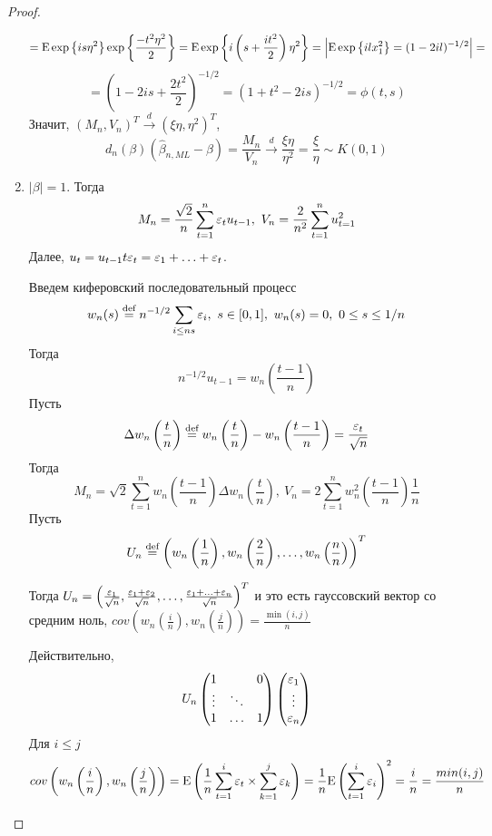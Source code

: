 \begin{proof}
\begin{enumerate}
        \[=\mathrm{E}\exp{\left\{is\eta^2\right\}}\exp{\left\{\frac{-t^2\eta^2}{2}\right\}}=\mathrm{E}\exp{\left\{i\left(s+\frac{it^2}{2}\right)\eta^2\right\}}=\Big\lvert\mathrm{E}\exp{\left\{ilx_1^2\right\}}=(1-2il)^{-1/2}\Big\rvert=\]
        \[=\left(1-2is+\frac{2t^2}{2}\right)^{-1/2}=(1+t^2-2is)^{-1/2}=\phi(t,s)\]
        Значит, $(M_n,V_n)^T\xrightarrow{d}(\xi\eta,\eta^2)^T$,
        \[d_n(\beta)(\widehat{\beta}_{n,ML}-\beta)=\frac{M_n}{V_n}\xrightarrow{d}\frac{\xi\eta}{\eta^2}=\frac{\xi}{\eta}\sim K(0,1)\]
        \item \underline{$\left\lvert \beta\right\rvert =1$}. Тогда
        \[M_n=\frac{\sqrt{2}}{n}\sum_{t=1}^n\eps_tu_{t-1},\ V_n=\frac{2}{n^2}\sum_{t=1}^nu_{t=1}^2\]
        Далее, $u_t=u_{t-1}t\varepsilon_t=\varepsilon_1+\ldots+\varepsilon_t$.

        Введем киферовский последовательный процесс
        \[w_n(s)\defeq n^{-1/2}\sum_{i\leq ns}\eps_i,\ s\in[0,1],\ w_n(s)=0,\ 0\leq s\leq 1/n\]
        Тогда 
        \[n^{-1/2}u_{t-1}=w_n\left(\frac{t-1}{n}\right)\]
        Пусть
        \[\Delta w_n\left(\frac{t}{n}\right)\stackrel{\text{def}}{=} w_n\left(\frac{t}{n}\right)-w_n\left(\frac{t-1}{n}\right)=\frac{\varepsilon_t}{\sqrt{n}}\]
        Тогда
        \[M_n=\sqrt{2}\sum_{t=1}^nw_n\left(\frac{t-1}{n}\right)\Delta w_n\left(\frac{t}{n}\right),\ V_n=2\sum_{t=1}^nw_n^2\left(\frac{t-1}{n}\right)\frac{1}{n}\]
        Пусть
        \[U_n\stackrel{\text{def}}{=} \left(w_n\left(\frac{1}{n}\right), w_n\left(\frac{2}{n}\right),\ldots,w_n\left(\frac{n}{n}\right)\right)^T\]
        \begin{leftbar}
            Тогда $U_n=\left(\frac{\varepsilon_1}{\sqrt{n}},\frac{\varepsilon_1+\varepsilon_2}{\sqrt{n}},\ldots,\frac{\varepsilon_1+\ldots+\varepsilon_n}{\sqrt{n}}\right)^T$
            и это есть гауссовский вектор со средним ноль, $cov\left(w_n\left(\frac{i}{n}\right),w_n\left(\frac{j}{n}\right)\right)=\frac{\min(i,j)}{n}$
        \end{leftbar}
        Действительно,
        \[U_n\begin{pmatrix}
            1      &        & 0 \\
            \vdots & \ddots &    \\
            1      & \ldots &  1 \\
        \end{pmatrix}\begin{pmatrix}
            \varepsilon_1  \\ \vdots \\ \varepsilon_n
        \end{pmatrix}\]
        Для $i\leq j$
        \[cov\left(w_n\left(\frac{i}{n}\right),w_n\left(\frac{j}{n}\right)\right)=\mathrm{E}\left(\frac{1}{n}\sum_{t=1}^i\varepsilon_t\times\sum_{k=1}^j\varepsilon_k\right)=\frac{1}{n}\mathrm{E}\left(\sum_{t=1}^i\varepsilon_i\right)^2=\frac{i}{n}=\frac{min(i,j)}{n}\]

\end{enumerate}
\end{proof}
